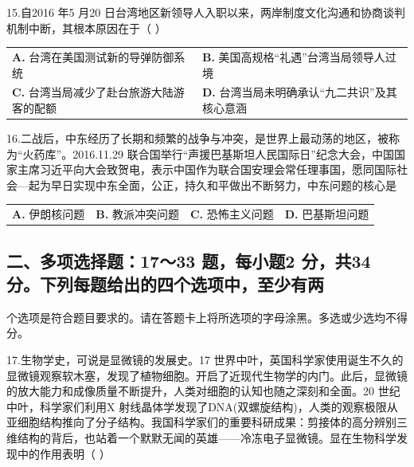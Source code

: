 \documentclass[UTF8,11pt]{ctexart}
\begin{document}
15.自2016 年5 月20 日台湾地区新领导人入职以来，两岸制度文化沟通和协商谈判机制中断，其根本原因在于（  ）


\begin{center}\begin{tabular}{>{\raggedright\arraybackslash}p{\dimexpr(\linewidth-4\tabcolsep)/2\relax}>{\raggedright\arraybackslash}p{\dimexpr(\linewidth-4\tabcolsep)/2\relax}}
\textbf{A.} 台湾在美国测试新的导弹防御系统 & \textbf{B.} 美国高规格“礼遇”台湾当局领导人过境\\[.35em]
\textbf{C.} 台湾当局减少了赴台旅游大陆游客的配额 & \textbf{D.} 台湾当局未明确承认“九二共识”及其核心意涵\\[.35em]\end{tabular}\end{center}

16.二战后，中东经历了长期和频繁的战争与冲突，是世界上最动荡的地区，被称为“火药库”。2016.11.29 联合国举行“声援巴基斯坦人民国际日”纪念大会，中国国家主席习近平向大会致贺电，表示中国作为联合国安理会常任理事国，愿同国际社会—起为早日实现中东全面，公正，持久和平做出不断努力，中东问题的核心是


\begin{center}\begin{tabular}{>{\raggedright\arraybackslash}p{\dimexpr(\linewidth-8\tabcolsep)/4\relax}>{\raggedright\arraybackslash}p{\dimexpr(\linewidth-8\tabcolsep)/4\relax}>{\raggedright\arraybackslash}p{\dimexpr(\linewidth-8\tabcolsep)/4\relax}>{\raggedright\arraybackslash}p{\dimexpr(\linewidth-8\tabcolsep)/4\relax}}
\textbf{A.} 伊朗核问题 & \textbf{B.} 教派冲突问题 & \textbf{C.} 恐怖主义问题 & \textbf{D.} 巴基斯坦问题\\[.35em]\end{tabular}\end{center}

\subsection*{二、多项选择题：17～33 题，每小题2 分，共34 分。下列每题给出的四个选项中，至少有两}

个选项是符合题目要求的。请在答题卡上将所选项的字母涂黑。多选或少选均不得分。


17.生物学史，可说是显微镜的发展史。17 世界中叶，英国科学家使用诞生不久的显微镜观察软木塞，发现了植物细胞。开启了近现代生物学的内门。此后，显微镜的放大能力和成像质量不断提升，人类对细胞的认知也随之深刻和全面。20 世纪中叶，科学家们利用X 射线晶体学发现了DNA(双螺旋结构)，人类的观察极限从亚细胞结构推向了分子结构。我国科学家们的重要科研成果：剪接体的高分辨别三维结构的背后，也站着一个默默无闻的英雄——冷冻电子显微镜。显在生物科学发现中的作用表明（     ）
\end{document}
